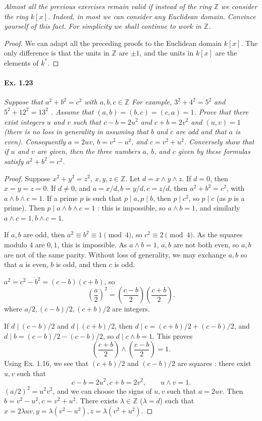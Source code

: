 \documentclass[11pt,a4paper]{article}
\newcommand{\Z}{\mathbb{Z}}
\begin{document}
{{\it Almost all the previous exercises remain valid if instead of the ring $\Z$ we consider the ring $k[x]$. Indeed, in most we can consider any Euclidean domain. Convince yourself of this fact. For simplicity we shall continue to work in $\Z$.
}

\begin{proof}
We can adapt all the preceding proofs to the Euclidean domain $k[x]$. The only difference is that the units in $\Z$ are $\pm1$, and the units in $k[x]$ are the elements of $k^*$.
\end{proof}

\paragraph{Ex. 1.23}

{\it Suppose that $a^2 + b^2 = c^2$ with $a, b, c \in \Z$ For example, $3^2 + 4^2 = 5^2$ and $5^2 +
12^2 = 13^2$ . Assume that $(a, b) = (b, c) = (c, a) = 1$. Prove that there exist integers $u$
and $v$ such that $c - b = 2u^2$ and $c + b = 2v^2$ and $(u, v) = 1$ (there is no loss in
generality in assuming that $b$ and $c$ are odd and that $a$ is even). Consequently $a = 2uv$,
$b = v^2 - u^2$, and $c = v^2 + u^2$. Conversely show that if $u$ and $v$ are given, then the
three numbers $a$, $b$, and $c$ given by these formulas satisfy $a^2 + b^2 = c^2$.

}

\begin{proof}Suppose $x^2+y^2 = z^2,\ x,y,z \in \Z$. Let $d = x\wedge y \wedge z$. If $d = 0$, then $x=y=z=0$. If $d \neq 0$, and $a = x/d, b=y/d,c=z/d$, then $a^2+b^2 = c^2$, with $a\wedge b \wedge c = 1$. If a prime $p$ is such that $p \mid a, p\mid b$, then $p \mid c^2$, so $p \mid c$ (as $p$ is a prime). Then $p \mid a\wedge b \wedge c =1$ : this is impossible, so $a\wedge b = 1$, and similarly $a\wedge c = 1, b \wedge c = 1$.

If $a,b$ are odd, then $a^2 \equiv b^2 \equiv 1 \pmod 4$, so $c^2 \equiv 2 \pmod 4$. As the squares modulo 4 are $0,1$, this is impossible. As $a\wedge b = 1$, $a,b$ are not both even, so $a,b$ are not of the same parity. Without loss of generality, we may exchange $a,b$ so that $a$ is even, $b$ is odd, and then $c$ is odd.

$a^2 =c^2 - b^2 = (c-b)(c+b)$, so $$\left(\frac{a}{2}\right)^2 = \left(\frac{c-b}{2}\right) \left(\frac{c+b}{2}\right).$$
where $a/2,(c-b)/2,(c+b)/2$ are integers.

If $d \mid (c-b)/2$ and $d \mid (c+b)/2$, then $d \mid c = (c+b)/2+ (c-b)/2$, and $d \mid b = (c-b)/2 - (c-b)/2$, so $d \mid c\wedge b = 1$. This proves 
$$\left(\frac{c+b}{2}\right) \wedge \left(\frac{c-b}{2}\right) = 1.$$
Using Ex. 1.16, we see that $(c+b)/2$ and $(c-b)/2$ are squares : there exist $u,v$ such that
$$c-b = 2u^2, c+b = 2 v^2,\qquad u\wedge v = 1.$$
$(a/2)^2 = u^2v^2$, and we can choose the signs of $u,v$ such that $a = 2 uv$. Then $b = v^2 - u^2, c = v^2+u^2$.
There exists $\lambda \in \Z$ ($\lambda = d$) such that $x = 2 \lambda uv, y = \lambda (v^2 - u^2), z = \lambda (v^2 +u^2)$.


\end{proof}}
\end{document}
